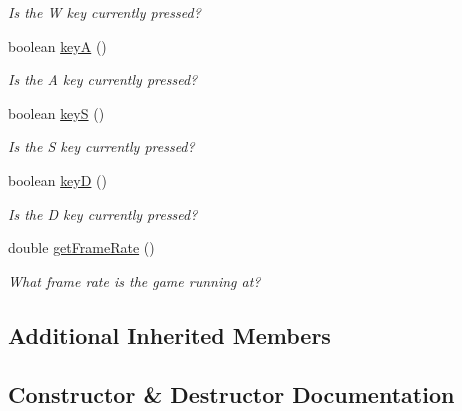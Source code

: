 \begin{DoxyCompactItemize}
\begin{DoxyCompactList}\small\item\em Is the W key currently pressed? \end{DoxyCompactList}\item 
boolean \hyperlink{classbridges_1_1games_1_1_non_blocking_game_a4328a21ca65c26e11161dfe362770917}{keyA} ()
\begin{DoxyCompactList}\small\item\em Is the A key currently pressed? \end{DoxyCompactList}\item 
boolean \hyperlink{classbridges_1_1games_1_1_non_blocking_game_a4beb82246ef1eaf8c13aa406632ab936}{keyS} ()
\begin{DoxyCompactList}\small\item\em Is the S key currently pressed? \end{DoxyCompactList}\item 
boolean \hyperlink{classbridges_1_1games_1_1_non_blocking_game_a830a2e8127b042f8915deb61f0038f2a}{keyD} ()
\begin{DoxyCompactList}\small\item\em Is the D key currently pressed? \end{DoxyCompactList}\item 
double \hyperlink{classbridges_1_1games_1_1_non_blocking_game_a28e91d62c0261acb7b1b0c12a9905275}{get\+Frame\+Rate} ()
\begin{DoxyCompactList}\small\item\em What frame rate is the game running at? \end{DoxyCompactList}\end{DoxyCompactItemize}
\subsection*{Additional Inherited Members}


\subsection{Constructor \& Destructor Documentation}
\mbox{\label{classbridges_1_1games_1_1_non_blocking_game_a49b9b0ec57b9ab0fe099922bde75ed8a}} 

